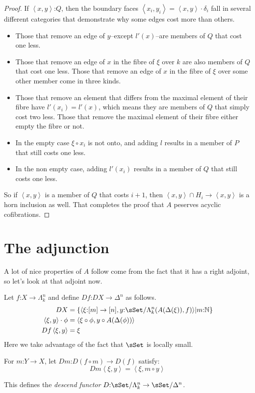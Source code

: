 \documentclass{tac}
\newcommand\of{\mathord:}
\newcommand\set[1]{\left\{#1\right\}}
\newcommand\nno{\mathbb{N}}
\newcommand\tuplet[1]{\left\langle{} #1 \right\rangle}
\newcommand\simplex[1]{\Delta^{#1}}
\newcommand\horn[2]{\Lambda^{#1}_{#2}}
\newcommand\Y{\Delta}
\begin{document}
\begin{proof}
  If \(\tuplet{x,y}\of Q\), then the boundary faces 
  \(\tuplet{x_i,y_i} = \tuplet{x,y}\cdot\delta_i\) fall in several different
  categories that demonstrate why some edges cost more than others. 
  \begin{itemize}
  \item Those that remove an edge of \(y\)--except \(l'(x)\)--are members of 
  \(Q\) 
  that cost one less. 
  \item Those that remove an edge of \(x\) in the fibre of \(\xi \) over \(k\) 
  are also 
  members of \(Q\) that cost one less. Those that remove an edge of \(x\) in 
  the fibre of \(\xi \) over some other member come in three kinds.
  \item Those that remove an element that differs from the maximal element of 
  their 
  fibre have \(l'(x_i) = l'(x)\), which means they are members of \(Q\) that 
  simply cost two less. 
  Those that remove the maximal element of their fibre either empty the fibre
  or not. 
  \item In the empty case \(\xi\circ x_i\) is not onto, and adding \(l\) results
  in a member of \(P\) that still costs one less.
  \item In the non empty case, adding \(l'(x_i)\) results in a member of \(Q\)
  that still costs one less.
  \end{itemize}
  So if \(\tuplet{x,y}\) is a member of \(Q\) that costs \(i+1\), then
  \(\tuplet{x,y}\cap H_i \to \tuplet{x,y}\) is a horn inclusion as well.
  That completes the proof that \(A\) peserves acyclic cofibrations.
\end{proof}

\section{The adjunction}
A lot of nice properties of \(A\) follow come from the fact 
that it has a right adjoint, so let's look at that adjoint
now.

\begin{definition}\label{descend functor}
Let \(f\of X\to \horn{n}{k} \) and define 
\(Df\of DX\to \simplex{n}\) as follows.
\begin{align}
  \label{DX1} DX &= \set{\tuplet{
    \xi\of [m]\to [n],
    y \of \sSet/\horn{n}{k}(A(\Y(\xi)), f) 
  }\middle|m\of\nno}\\
  \label{DX2} \tuplet{\xi,y}\cdot\phi &= \tuplet{
    \xi\circ \phi,
    y\circ A(\Y(\phi))
  }\\
  \label{Df} Df \tuplet{\xi,y} &= \xi
\end{align}
Here we take advantage of the fact that \(\sSet \) is locally 
small.

For \(m\of Y\to X\), let \(Dm\of D(f\circ m)\to D(f)\) satisfy:
\begin{equation}
  \label{Dm} Dm \tuplet{\xi,y} = \tuplet{\xi,m\circ y}
\end{equation}

This defines the \emph{descend functor}
\(D\of \sSet/\horn{n}{k} \to \sSet/\simplex{n}\).
\end{definition}
\end{document}
